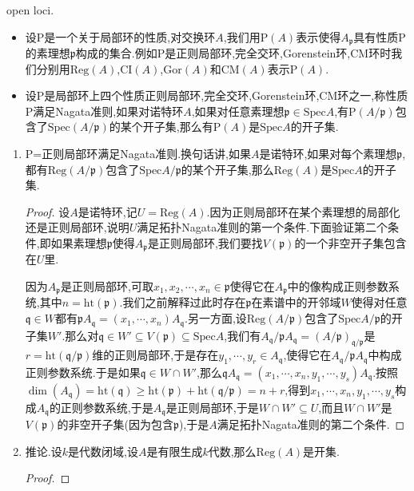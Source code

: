 open loci.
\begin{itemize}
	\item 设P是一个关于局部环的性质,对交换环$A$,我们用$\mathrm{P}(A)$表示使得$A_{\mathfrak{p}}$具有性质P的素理想$\mathfrak{p}$构成的集合.例如P是正则局部环,完全交环,Gorenstein环,CM环时我们分别用$\mathrm{Reg}(A)$,$\mathrm{CI}(A)$,$\mathrm{Gor}(A)$和$\mathrm{CM}(A)$表示$\mathrm{P}(A)$.
	\item 设P是局部环上四个性质正则局部环,完全交环,Gorenstein环,CM环之一,称性质P满足Nagata准则,如果对诺特环$A$,如果对任意素理想$\mathfrak{p}\in\mathrm{Spec}A$,有$\mathrm{P}(A/\mathfrak{p})$包含了$\mathrm{Spec}(A/\mathfrak{p})$的某个开子集,那么有$\mathrm{P}(A)$是$\mathrm{Spec}A$的开子集.
\end{itemize}
\begin{enumerate}
	\item P=正则局部环满足Nagata准则.换句话讲,如果$A$是诺特环,如果对每个素理想$\mathfrak{p}$,都有$\mathrm{Reg}(A/\mathfrak{p})$包含了$\mathrm{Spec}A/\mathfrak{p}$的某个开子集,那么$\mathrm{Reg}(A)$是$\mathrm{Spec}A$的开子集.
	\begin{proof}
		
		设$A$是诺特环,记$U=\mathrm{Reg}(A)$.因为正则局部环在某个素理想的局部化还是正则局部环,说明$U$满足拓扑Nagata准则的第一个条件.下面验证第二个条件,即如果素理想$\mathfrak{p}$使得$A_{\mathfrak{p}}$是正则局部环,我们要找$V(\mathfrak{p})$的一个非空开子集包含在$U$里.
		
		\qquad
		
		因为$A_{\mathfrak{p}}$是正则局部环,可取$x_1,x_2,\cdots,x_n\in\mathfrak{p}$使得它在$A_{\mathfrak{p}}$中的像构成正则参数系统,其中$n=\mathrm{ht}(\mathfrak{p})$.我们之前解释过此时存在$\mathfrak{p}$在素谱中的开邻域$W$使得对任意$\mathfrak{q}\in W$都有$\mathfrak{p}A_{\mathfrak{q}}=(x_1,\cdots,x_n)A_{\mathfrak{q}}$.另一方面,设$\mathrm{Reg}(A/\mathfrak{p})$包含了$\mathrm{Spec}A/\mathfrak{p}$的开子集$W'$.那么对$\mathfrak{q}\in W'\subseteq V(\mathfrak{p})\subseteq\mathrm{Spec}A$,我们有$A_{\mathfrak{q}}/\mathfrak{p}A_{\mathfrak{q}}=(A/\mathfrak{p})_{\mathfrak{q}/\mathfrak{p}}$是$r=\mathrm{ht}(\mathfrak{q}/\mathfrak{p})$维的正则局部环,于是存在$y_1,\cdots,y_r\in A_{\mathfrak{q}}$,使得它在$A_{\mathfrak{q}}/\mathfrak{p}A_{\mathfrak{q}}$中构成正则参数系统.于是如果$\mathfrak{q}\in W\cap W'$,那么$\mathfrak{q}A_{\mathfrak{q}}=(x_1,\cdots,x_n,y_1,\cdots,y_s)A_{\mathfrak{q}}$.按照$\dim(A_{\mathfrak{q}})=\mathrm{ht}(\mathfrak{q})\ge\mathrm{ht}(\mathfrak{p})+\mathrm{ht}(\mathfrak{q}/\mathfrak{p})=n+r$,得到$x_1,\cdots,x_n,y_1,\cdots,y_s$构成$A_{\mathfrak{q}}$的正则参数系统,于是$A_{\mathfrak{q}}$是正则局部环,于是$W\cap W'\subseteq U$,而且$W\cap W'$是$V(\mathfrak{p})$的非空开子集(因为包含$\mathfrak{p}$),于是$A$满足拓扑Nagata准则的第二个条件.
	\end{proof}
    \item 推论.设$k$是代数闭域,设$A$是有限生成$k$代数,那么$\mathrm{Reg}(A)$是开集.
    \begin{proof}
    	

\end{proof}
\end{enumerate}
